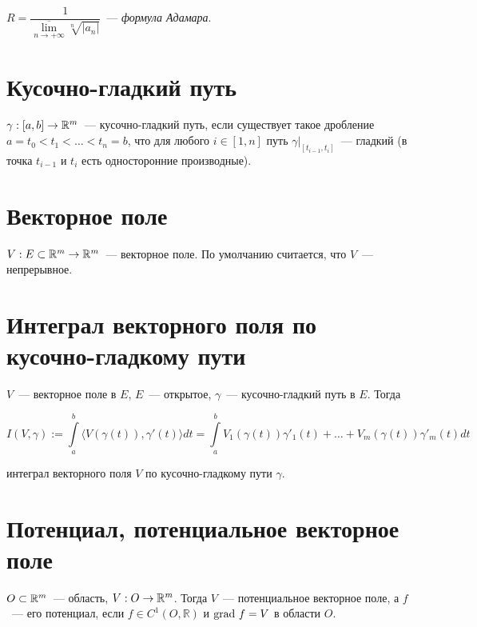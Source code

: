 \documentclass{article}
\begin{document}
        $R = \dfrac{1}{\overline{\lim\limits_{n \rightarrow +\infty}} \sqrt[n]{|a_n|}}$~--- \textit{формула Адамара}.
    
    \newpage
    
    \section{Кусочно-гладкий путь}
    
        $\gamma : [a, b] \rightarrow \mathbb{R}^m$~--- кусочно-гладкий путь, если существует такое дробление $a = t_0 < t_1 < \ldots < t_n = b$, что для любого $i \in [1, n]$ путь $\gamma \big|_{[t_{i - 1}, t_i]}$~--- гладкий (в точка $t_{i - 1}$ и $t_i$ есть односторонние производные).
        
    \newpage
    
    \section{Векторное поле}
    
        $V : E \subset \mathbb{R}^m \rightarrow \mathbb{R}^m$~--- векторное поле. По умолчанию считается, что $V$~--- непрерывное.
        
    \newpage
    
    \section{Интеграл векторного поля по кусочно-гладкому пути}
    
        $V$~--- векторное поле в $E$, $E$~--- открытое, $\gamma$~--- кусочно-гладкий путь в $E$. Тогда
        
        $$I(V, \gamma) := \int\limits^b_a \langle V \left( \gamma(t) \right), \gamma' (t) \rangle dt = \int\limits^b_a V_1 \left( \gamma(t) \right) \gamma'_1(t) + \ldots + V_m \left( \gamma(t) \right) \gamma'_m(t) dt$$
        
        интеграл векторного поля $V$ по кусочно-гладкому пути $\gamma$.
        
    \newpage
    
    \section{Потенциал, потенциальное векторное поле}
    
        $O \subset \mathbb{R}^m$~--- область, $V : O \rightarrow \mathbb{R}^m$. Тогда $V$~--- потенциальное векторное поле, а $f$~--- его потенциал, если $f \in C^1 \left( O, \mathbb{R} \right)$ и $\grad f = V$ в области $O$.
        
\end{document}
